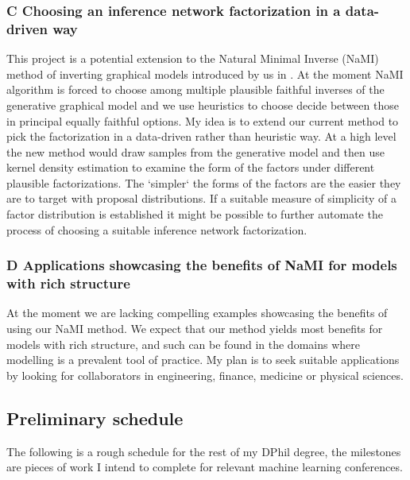 \documentclass[12pt]{article}
\begin{document}
\subsubsection*{C \quad Choosing an inference network factorization in a data-driven way}
This project is a potential extension to the Natural Minimal Inverse (NaMI) method of inverting graphical models introduced by us in \citep{Webb2018}.
At the moment NaMI algorithm is forced to choose among multiple plausible faithful inverses of the generative graphical model and we use  heuristics to choose decide between those in principal equally faithful options.
My idea is to extend our current method to pick the factorization in a data-driven rather than heuristic way.
At a high level the new method would draw samples from the generative model and then use kernel density estimation to examine the form of the factors under different plausible factorizations. 
The `simpler` the forms of the factors are the easier they are to target with proposal distributions.
If a suitable measure of simplicity of a factor distribution is established it might be possible to further automate the process of choosing a suitable inference network factorization.


\subsubsection*{D \quad Applications showcasing the benefits of NaMI for models with rich structure}
At the moment we are lacking compelling examples showcasing the benefits of using our NaMI method.
We expect that our method yields most benefits for models with rich structure, and such can be found in the domains where
modelling is a prevalent tool of practice.
My plan is to seek suitable applications by looking for collaborators in engineering, finance, medicine or physical sciences.


\subsection{Preliminary schedule}
The following is a rough schedule for the rest of my DPhil degree, the milestones are pieces of work I intend to complete for relevant machine learning conferences.
\end{document}
